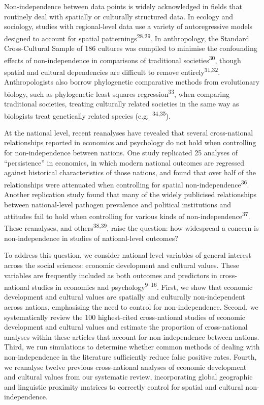 \documentclass[
  english,
  man,floatsintext]{apa6}
\begin{document}
Non-independence between data points is widely acknowledged in fields that routinely deal with spatially or culturally structured data. In ecology and sociology, studies with regional-level data use a variety of autoregressive models designed to account for spatial patternings\textsuperscript{28,29}. In anthropology, the Standard Cross-Cultural Sample of 186 cultures was compiled to minimise the confounding effects of non-independence in comparisons of traditional societies\textsuperscript{30}, though spatial and cultural dependencies are difficult to remove entirely\textsuperscript{31,32}. Anthropologists also borrow phylogenetic comparative methods from evolutionary biology, such as phylogenetic least squares regression\textsuperscript{33}, when comparing traditional societies, treating culturally related societies in the same way as biologists treat genetically related species (e.g.~\textsuperscript{34,35}).

At the national level, recent reanalyses have revealed that several cross-national relationships reported in economics and psychology do not hold when controlling for non-independence between nations. One study replicated 25 analyses of \enquote{persistence} in economics, in which modern national outcomes are regressed against historical characteristics of those nations, and found that over half of the relationships were attenuated when controlling for spatial non-independence\textsuperscript{36}. Another replication study found that many of the widely publicised relationships between national-level pathogen prevalence and political institutions and attitudes fail to hold when controlling for various kinds of non-independence\textsuperscript{37}. These reanalyses, and others\textsuperscript{38,39}, raise the question: how widespread a concern is non-independence in studies of national-level outcomes?

To address this question, we consider national-level variables of general interest across the social sciences: economic development and cultural values. These variables are frequently included as both outcomes and predictors in cross-national studies in economics and psychology\textsuperscript{9--16}. First, we show that economic development and cultural values are spatially and culturally non-independent across nations, emphasising the need to control for non-independence. Second, we systematically review the 100 highest-cited cross-national studies of economic development and cultural values and estimate the proportion of cross-national analyses within these articles that account for non-independence between nations. Third, we run simulations to determine whether common methods of dealing with non-independence in the literature sufficiently reduce false positive rates. Fourth, we reanalyse twelve previous cross-national analyses of economic development and cultural values from our systematic review, incorporating global geographic and linguistic proximity matrices to correctly control for spatial and cultural non-independence.
\end{document}
